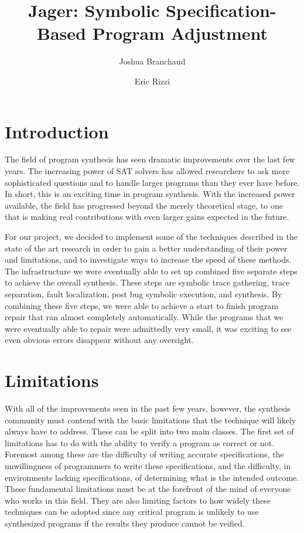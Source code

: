 \documentclass[]{article}
\author{Joshua Branchaud \and Eric Rizzi}
\date{}
\begin{document}
\title{Jager: Symbolic Specification-Based Program Adjustment}

\maketitle

\section{Introduction}
The field of program synthesis has seen dramatic improvements over the last
few years.  The increasing power of SAT solvers has allowed researchers to
ask more sophisticated questions and to handle larger programs than they
ever have before.  In short, this is an exciting time in program synthesis.
With the increased power available, the field has progressed beyond the
merely theoretical stage, to one that is making real contributions with even
larger gains expected in the future.

For our project, we decided to implement some of the techniques described in
the state of the art research in order to gain a better understanding of
their power and limitations, and to investigate ways to increase the speed
of these methods.  The infrastructure we were eventually able to set up
combined five separate steps to achieve the overall synthesis.  These steps
are symbolic trace gathering, trace separation, fault localization, post bug
symbolic execution, and synthesis.  By combining these five steps, we were
able to achieve a start to finish program repair that ran almost completely
automatically.  While the programs that we were eventually able to repair
were admittedly very small, it was exciting to see even obvious errors
disappear without any oversight.


\section{Limitations}
With all of the improvements seen in the past few years, however, the
synthesis community must contend with the basic limitations that the
technique will likely always have to address.  These can be split into two
main classes.  The first set of limitations has to do with the ability to
verify a program as correct or not.  Foremost among these are the difficulty
of writing accurate specifications, the unwillingness of programmers to
write these specifications, and the difficulty, in environments lacking
specifications, of determining what is the intended outcome.  These
fundamental limitations must be at the forefront of the mind of everyone who
works in this field.  They are also limiting factors to how widely these
techniques can be adopted since any critical program is unlikely to use
synthesized programs if the results they produce cannot be veified.
\end{document}

